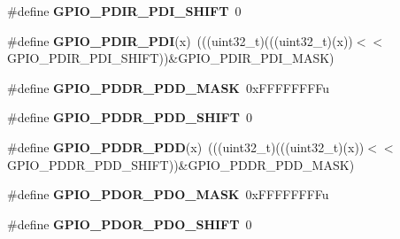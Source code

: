 \begin{DoxyCompactItemize}
\item 
\#define {\bfseries G\+P\+I\+O\+\_\+\+P\+D\+I\+R\+\_\+\+P\+D\+I\+\_\+\+S\+H\+I\+FT}~0\hypertarget{group__GPIO__Register__Masks_ga99fd9212dd769bb1964a28a864c6c741}{}\label{group__GPIO__Register__Masks_ga99fd9212dd769bb1964a28a864c6c741}

\item 
\#define {\bfseries G\+P\+I\+O\+\_\+\+P\+D\+I\+R\+\_\+\+P\+DI}(x)~(((uint32\+\_\+t)(((uint32\+\_\+t)(x))$<$$<$G\+P\+I\+O\+\_\+\+P\+D\+I\+R\+\_\+\+P\+D\+I\+\_\+\+S\+H\+I\+FT))\&G\+P\+I\+O\+\_\+\+P\+D\+I\+R\+\_\+\+P\+D\+I\+\_\+\+M\+A\+SK)\hypertarget{group__GPIO__Register__Masks_ga8f80c8e42743151c73569b5cef49f2b2}{}\label{group__GPIO__Register__Masks_ga8f80c8e42743151c73569b5cef49f2b2}

\item 
\#define {\bfseries G\+P\+I\+O\+\_\+\+P\+D\+D\+R\+\_\+\+P\+D\+D\+\_\+\+M\+A\+SK}~0x\+F\+F\+F\+F\+F\+F\+F\+Fu\hypertarget{group__GPIO__Register__Masks_ga67567a60f48d2bfb5584cd8de8936788}{}\label{group__GPIO__Register__Masks_ga67567a60f48d2bfb5584cd8de8936788}

\item 
\#define {\bfseries G\+P\+I\+O\+\_\+\+P\+D\+D\+R\+\_\+\+P\+D\+D\+\_\+\+S\+H\+I\+FT}~0\hypertarget{group__GPIO__Register__Masks_gacdd12c96f7650759c90a98bb606bd776}{}\label{group__GPIO__Register__Masks_gacdd12c96f7650759c90a98bb606bd776}

\item 
\#define {\bfseries G\+P\+I\+O\+\_\+\+P\+D\+D\+R\+\_\+\+P\+DD}(x)~(((uint32\+\_\+t)(((uint32\+\_\+t)(x))$<$$<$G\+P\+I\+O\+\_\+\+P\+D\+D\+R\+\_\+\+P\+D\+D\+\_\+\+S\+H\+I\+FT))\&G\+P\+I\+O\+\_\+\+P\+D\+D\+R\+\_\+\+P\+D\+D\+\_\+\+M\+A\+SK)\hypertarget{group__GPIO__Register__Masks_ga9836cb3ac719630f741fe6a0292083fc}{}\label{group__GPIO__Register__Masks_ga9836cb3ac719630f741fe6a0292083fc}

\item 
\#define {\bfseries G\+P\+I\+O\+\_\+\+P\+D\+O\+R\+\_\+\+P\+D\+O\+\_\+\+M\+A\+SK}~0x\+F\+F\+F\+F\+F\+F\+F\+Fu\hypertarget{group__GPIO__Register__Masks_gafd2a8274691295293b3cabfe86089801}{}\label{group__GPIO__Register__Masks_gafd2a8274691295293b3cabfe86089801}

\item 
\#define {\bfseries G\+P\+I\+O\+\_\+\+P\+D\+O\+R\+\_\+\+P\+D\+O\+\_\+\+S\+H\+I\+FT}~0\hypertarget{group__GPIO__Register__Masks_ga495b5f1e63de863534ce0c5f25f137ab}{}\label{group__GPIO__Register__Masks_ga495b5f1e63de863534ce0c5f25f137ab}


\end{DoxyCompactItemize}

